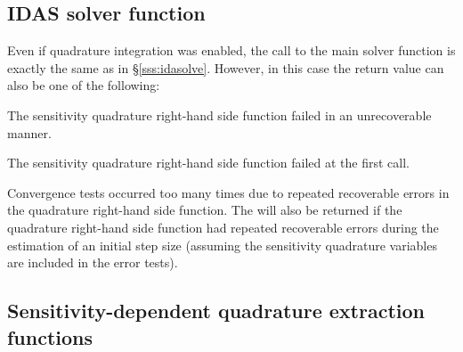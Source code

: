 \subsection{IDAS solver function}

Even if quadrature integration was enabled, the call to the main solver 
function  is exactly the same as in \S\ref{sss:idasolve}. However, in this
case the return value  can also be one of the following:
\begin{args}
\item[\Id{IDA\_QSRHS\_FAIL}]
  The sensitivity quadrature right-hand side function failed in an unrecoverable manner.
\item[\Id{IDA\_FIRST\_QSRHS\_ERR}]
  The sensitivity quadrature right-hand side function failed at the first call.
\item[\Id{IDA\_REP\_QSRHS\_ERR}]
  Convergence tests occurred too many times due to repeated recoverable errors in
  the quadrature right-hand side function. The  will also
  be returned if the quadrature right-hand side function had repeated recoverable errors
  during the estimation of an initial step size (assuming the sensitivity quadrature
  variables are included in the error tests).
  \end{args}


\subsection{Sensitivity-dependent quadrature extraction functions}\label{ss:quad_sens_get}

